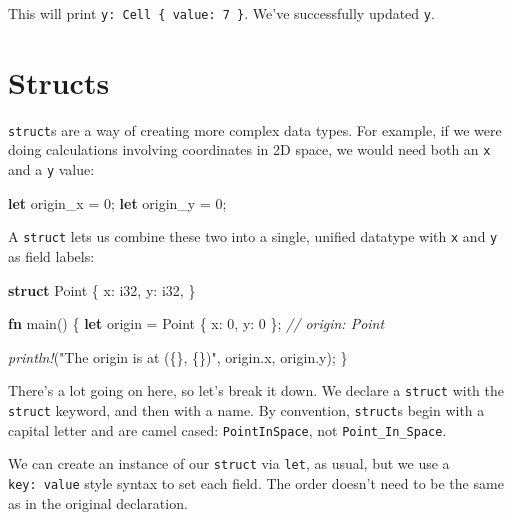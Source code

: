 \documentclass[a4paper,]{book}
\renewcommand*{\hypertarget}[3][\ar]{%
  \def\ar{#2}%
  \label{#1}%
  #3}
\newenvironment{Shaded}{\begin{snugshade}}{\end{snugshade}}
\newcommand{\KeywordTok}[1]{\textcolor[rgb]{0.13,0.29,0.53}{\textbf{{#1}}}}
\newcommand{\DataTypeTok}[1]{\textcolor[rgb]{0.13,0.29,0.53}{{#1}}}
\newcommand{\DecValTok}[1]{\textcolor[rgb]{0.00,0.00,0.81}{{#1}}}
\newcommand{\StringTok}[1]{\textcolor[rgb]{0.31,0.60,0.02}{{#1}}}
\newcommand{\CommentTok}[1]{\textcolor[rgb]{0.56,0.35,0.01}{\textit{{#1}}}}
\newcommand{\PreprocessorTok}[1]{\textcolor[rgb]{0.56,0.35,0.01}{\textit{{#1}}}}
\newcommand{\NormalTok}[1]{{#1}}
\begin{document}
This will print \texttt{y:\ Cell\ \{\ value:\ 7\ \}}. We've successfully
updated \texttt{y}.

\hypertarget{sec--structs}{\section{Structs}\label{sec--structs}}

\texttt{struct}s are a way of creating more complex data types. For
example, if we were doing calculations involving coordinates in 2D
space, we would need both an \texttt{x} and a \texttt{y} value:

\begin{Shaded}
\begin{Highlighting}[]
\KeywordTok{let} \NormalTok{origin_x = }\DecValTok{0}\NormalTok{;}
\KeywordTok{let} \NormalTok{origin_y = }\DecValTok{0}\NormalTok{;}
\end{Highlighting}
\end{Shaded}

A \texttt{struct} lets us combine these two into a single, unified
datatype with \texttt{x} and \texttt{y} as field labels:

\begin{Shaded}
\begin{Highlighting}[]
\KeywordTok{struct} \NormalTok{Point \{}
    \NormalTok{x: }\DataTypeTok{i32}\NormalTok{,}
    \NormalTok{y: }\DataTypeTok{i32}\NormalTok{,}
\NormalTok{\}}

\KeywordTok{fn} \NormalTok{main() \{}
    \KeywordTok{let} \NormalTok{origin = Point \{ x: }\DecValTok{0}\NormalTok{, y: }\DecValTok{0} \NormalTok{\}; }\CommentTok{// origin: Point}

    \PreprocessorTok{println!}\NormalTok{(}\StringTok{"The origin is at (\{\}, \{\})"}\NormalTok{, origin.x, origin.y);}
\NormalTok{\}}
\end{Highlighting}
\end{Shaded}

There's a lot going on here, so let's break it down. We declare a
\texttt{struct} with the \texttt{struct} keyword, and then with a name.
By convention, \texttt{struct}s begin with a capital letter and are
camel cased: \texttt{PointInSpace}, not \texttt{Point\_In\_Space}.

We can create an instance of our \texttt{struct} via \texttt{let}, as
usual, but we use a \texttt{key:\ value} style syntax to set each field.
The order doesn't need to be the same as in the original declaration.
\end{document}
